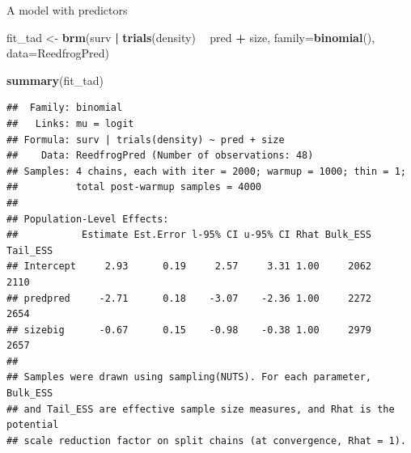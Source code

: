 \documentclass[
  ignorenonframetext,
]{beamer}
\newenvironment{Shaded}{\begin{snugshade}}{\end{snugshade}}
\newcommand{\DataTypeTok}[1]{\textcolor[rgb]{0.13,0.29,0.53}{#1}}
\newcommand{\KeywordTok}[1]{\textcolor[rgb]{0.13,0.29,0.53}{\textbf{#1}}}
\newcommand{\NormalTok}[1]{#1}
\newcommand{\OperatorTok}[1]{\textcolor[rgb]{0.81,0.36,0.00}{\textbf{#1}}}
\newcommand{\StringTok}[1]{\textcolor[rgb]{0.31,0.60,0.02}{#1}}
\begin{document}
\begin{frame}[fragile]{A model with predictors}
\protect\hypertarget{a-model-with-predictors}{}

\scriptsize

\begin{Shaded}
\begin{Highlighting}[]
\NormalTok{fit_tad <-}\StringTok{ }\KeywordTok{brm}\NormalTok{(surv }\OperatorTok{|}\StringTok{ }\KeywordTok{trials}\NormalTok{(density) }\OperatorTok{~}\StringTok{ }\NormalTok{pred }\OperatorTok{+}\StringTok{ }\NormalTok{size, }
               \DataTypeTok{family=}\KeywordTok{binomial}\NormalTok{(), }\DataTypeTok{data=}\NormalTok{ReedfrogPred)}
\end{Highlighting}
\end{Shaded}

\begin{Shaded}
\begin{Highlighting}[]
\KeywordTok{summary}\NormalTok{(fit_tad)}
\end{Highlighting}
\end{Shaded}

\begin{verbatim}
##  Family: binomial 
##   Links: mu = logit 
## Formula: surv | trials(density) ~ pred + size 
##    Data: ReedfrogPred (Number of observations: 48) 
## Samples: 4 chains, each with iter = 2000; warmup = 1000; thin = 1;
##          total post-warmup samples = 4000
## 
## Population-Level Effects: 
##           Estimate Est.Error l-95% CI u-95% CI Rhat Bulk_ESS Tail_ESS
## Intercept     2.93      0.19     2.57     3.31 1.00     2062     2110
## predpred     -2.71      0.18    -3.07    -2.36 1.00     2272     2654
## sizebig      -0.67      0.15    -0.98    -0.38 1.00     2979     2657
## 
## Samples were drawn using sampling(NUTS). For each parameter, Bulk_ESS
## and Tail_ESS are effective sample size measures, and Rhat is the potential
## scale reduction factor on split chains (at convergence, Rhat = 1).
\end{verbatim}

\end{frame}
\end{document}

